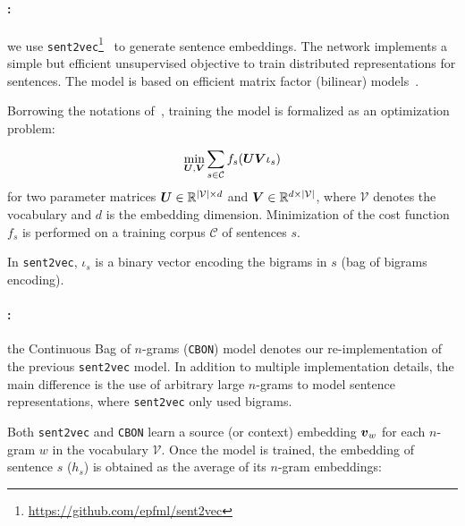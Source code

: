 \paragraph{:} we use \texttt{sent2vec}\footnote{\url{https://github.com/epfml/sent2vec}}~\cite{pagliardini18unsupervised} to generate sentence embeddings. The network implements a simple but efficient unsupervised objective to train distributed representations for sentences. 
The model is based on efficient matrix factor (bilinear) models~\cite{Mikolov13efficient,Mikolov13distributed,Pennington14glove}.

Borrowing the notations of~\citet{pagliardini18unsupervised}, training the model is formalized as an optimization problem:

\begin{equation*}
\min_{\boldsymbol{U},\boldsymbol{V}} \sum_{s\in \mathcal{C}} f_{s} (\boldsymbol{UV}\iota_{s})
\end{equation*}
\noindent 
for two parameter matrices $\boldsymbol{U} \in \mathbb{R}^{|\mathcal{V}|\times d}$ and $\boldsymbol{V} \in \mathbb{R} ^{d\times |\mathcal{V}|}$, where $\mathcal{V}$ denotes the vocabulary and $d$ is the embedding dimension. Minimization of the cost function $f_{s}$ is performed on a training corpus $\mathcal{C}$ of sentences $s$.

In \texttt{sent2vec}, $\iota_{s}$ is a binary vector encoding the bigrams in $s$ (bag of bigrams encoding). 

\paragraph{:} the Continuous Bag of $n$-grams (\texttt{CBON}) 
 model denotes our re-implementation of the previous \texttt{sent2vec} model. In addition to multiple implementation details, the main difference is the use of arbitrary large $n$-grams to model sentence representations, where \texttt{sent2vec} only used bigrams.

\vspace{0.1cm}

Both \texttt{sent2vec} and \texttt{CBON} learn a source (or context) embedding $\boldsymbol{v}_w$ for each $n$-gram $w$ in the vocabulary $\mathcal{V}$.
Once the model is trained, the embedding of sentence $s$ ($h_s$) is obtained as the average of its $n$-gram embeddings:

